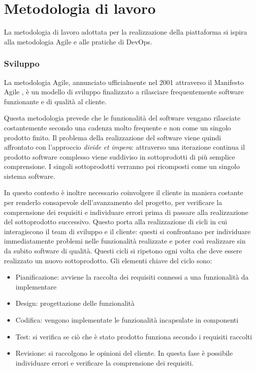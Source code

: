 \section{Metodologia di lavoro}
La metodologia di lavoro adottata per la realizzazione della piattaforma si ispira alla metodologia Agile e alle pratiche di DevOps.

\subsubsection{Sviluppo}
La metodologia Agile, annunciato ufficialmente nel 2001 attraverso il Manifesto Agile \cite{manifesto},
è un modello di sviluppo finalizzato a rilasciare frequentemente software funzionante e di qualità al cliente.

Questa metodologia prevede che le funzionalità del software vengano rilasciate costantemente
secondo una cadenza molto frequente e non come un singolo prodotto finito.
Il problema della realizzazione del software viene quindi affrontato con l'approccio \textit{divide et impera}:
attraverso una iterazione continua il prodotto software complesso viene suddiviso in sottoprodotti di più semplice comprensione.
I singoli sottoprodotti verranno poi ricomposti come un singolo sistema software.

In questo contesto è inoltre necessario coinvolgere il cliente in maniera costante per renderlo consapevole dell'avanzamento del progetto,
per verificare la comprensione dei requisiti e individuare errori prima di passare alla realizzazione del sottoprodotto successivo.
Questo porta alla realizzazione di cicli in cui interagiscono il team di sviluppo e il cliente: questi si confrontano
per individuare immediatamente problemi nelle funzionalità realizzate e poter così realizzare sin da subito software di qualità.
Questi cicli si ripetono ogni volta che deve essere realizzato un nuovo sottoprodotto. Gli elementi chiave del ciclo sono:
\begin{itemize}
    \itemsep0em
    \item Pianificazione: avviene la raccolta dei requisiti connessi a una funzionalità da implementare
    \item Design: progettazione delle funzionalità
    \item Codifica: vengono implementate le funzionalità incapsulate in componenti
    \item Test: si verifica se ciò che è stato prodotto funziona secondo i requisiti raccolti
    \item Revisione: si raccolgono le opinioni del cliente. In questa fase è possibile individuare errori e verificare la comprensione dei requisiti.
\end{itemize}

